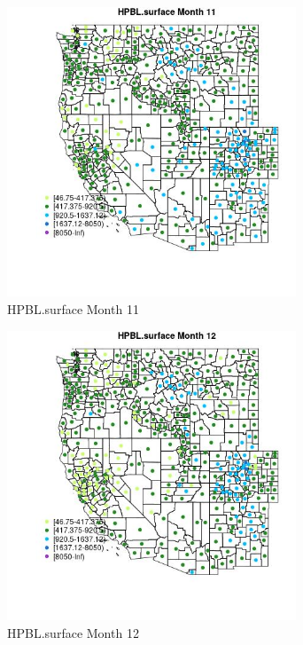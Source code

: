 \begin{figure} 
\centering  
\includegraphics[width=0.77\textwidth]{Code_Outputs/df_report_ML_predictors_CountyCentroid_Locations_Dates_2008-01-01to2018-12-31_MapObsMo11HPBLsurface.jpg} 
\caption{\label{fig:df_report_ML_predictors_CountyCentroid_Locations_Dates_2008-01-01to2018-12-31MapObsMo11HPBLsurface}HPBL.surface Month 11} 
\end{figure} 
 

\begin{figure} 
\centering  
\includegraphics[width=0.77\textwidth]{Code_Outputs/df_report_ML_predictors_CountyCentroid_Locations_Dates_2008-01-01to2018-12-31_MapObsMo12HPBLsurface.jpg} 
\caption{\label{fig:df_report_ML_predictors_CountyCentroid_Locations_Dates_2008-01-01to2018-12-31MapObsMo12HPBLsurface}HPBL.surface Month 12} 
\end{figure} 
 

